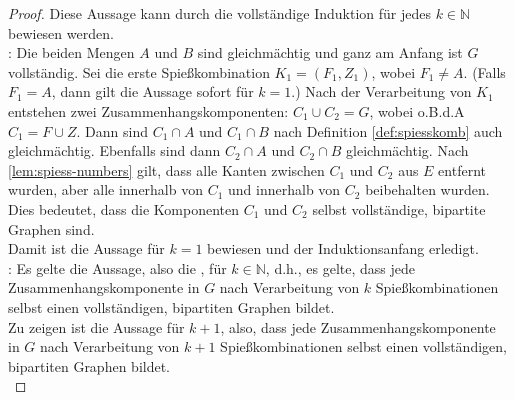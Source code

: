 \begin{proof}
Diese Aussage kann durch die vollständige Induktion für jedes $k \in \mathbb{N}$ bewiesen werden.\\
\noindent
{}: 
Die beiden Mengen $A$ und $B$ sind gleichmächtig und ganz am Anfang ist $G$ vollständig.
Sei die erste Spießkombination $K_1 = (F_1, Z_1)$, wobei $F_1 \neq A$. (Falls $F_1 = A$,
dann gilt die Aussage sofort für $k = 1$.)
Nach der Verarbeitung von $K_1$ 
entstehen zwei Zusammenhangskomponenten: $C_1 \cup C_2 = G$, wobei o.B.d.A $C_1 = F \cup Z$.
Dann sind $C_1 \cap A$ und $C_1 \cap B$ nach Definition \ref{def:spiesskomb} auch gleichmächtig. 
Ebenfalls sind dann $C_2 \cap A$ und $C_2 \cap B$ gleichmächtig.
Nach \ref{lem:spiess-numbers} gilt, dass alle Kanten zwischen $C_1$ und $C_2$
aus $E$ entfernt wurden, aber alle innerhalb von $C_1$ und innerhalb von $C_2$
beibehalten wurden.
Dies bedeutet, dass die Komponenten $C_1$ und $C_2$ selbst vollständige, bipartite Graphen sind.\\
Damit ist die Aussage für $k = 1$ bewiesen und der Induktionsanfang erledigt.\\

\noindent
{}: Es gelte die Aussage, also die ,
für $k \in \mathbb{N}$, d.h., es gelte,
dass jede Zusammenhangskomponente in $G$ nach Verarbeitung von $k$ Spießkombinationen selbst
einen vollständigen, bipartiten Graphen bildet.\\

Zu zeigen ist die Aussage für $k + 1$, also, dass jede Zusammenhangskomponente in $G$ nach Verarbeitung
von $k + 1$ Spießkombinationen selbst einen vollständigen, bipartiten Graphen bildet.\\


\end{proof}
